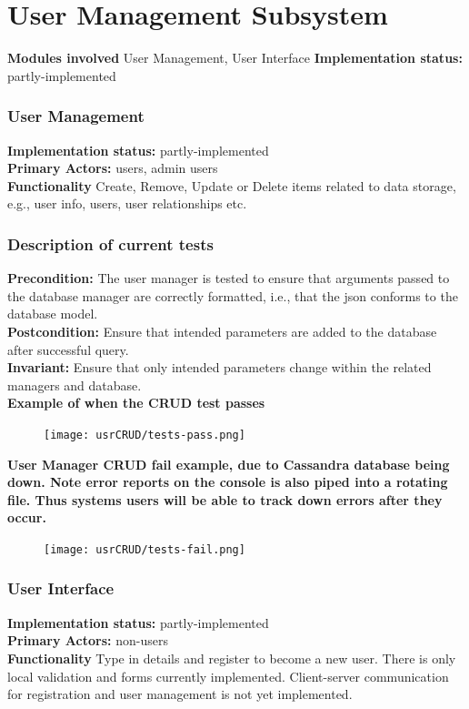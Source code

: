 \documentclass[12pt]{article}
\begin{document}
{	\section{User Management Subsystem }
	\textbf{Modules involved} User Management, User Interface
	\textbf{Implementation status:} partly-implemented


	\subsubsection{User Management}

	\textbf{Implementation status:} partly-implemented \\
	\textbf{Primary Actors:} users, admin users \\
	\textbf{Functionality} Create, Remove, Update or Delete items related to data storage, e.g., user info, users, user relationships etc.  \\
	\subsubsection{Description of current tests}
	\textbf{Precondition:} The user manager is tested to ensure that arguments passed to the database manager are correctly formatted, i.e., that the json conforms to the database model. \\
	\textbf{Postcondition:} Ensure that intended parameters are added to the database after successful query. \\
	\textbf{Invariant:} Ensure that only intended parameters change within the related managers and database. \\
	\textbf{Example of when the CRUD test passes}
	\begin{center}
	\begin{figure}[h]
		\texttt{[image: usrCRUD/tests-pass.png]}
	\end{figure}
	\end{center}
	\textbf{User Manager CRUD fail example, due to Cassandra database being down. Note error reports on the console is also piped into a rotating file. Thus systems users will be able to track down errors after they occur.}
	\begin{center}
	\begin{figure}[h]
		\texttt{[image: usrCRUD/tests-fail.png]}
	\end{figure}
	\end{center}



	\subsubsection{User Interface}
	\textbf{Implementation status:} partly-implemented \\
	\textbf{Primary Actors:} non-users \\
	\textbf{Functionality} Type in details and register to become a new user. There is only local validation and forms currently implemented. Client-server communication for registration and user management is not yet implemented.
}
\end{document}
